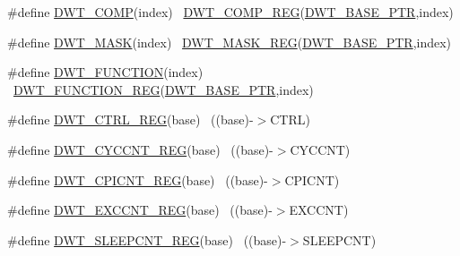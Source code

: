 \begin{DoxyCompactItemize}
\item 
\#define \hyperlink{group___d_w_t___register___accessor___macros_ga8cd13337dbf7cec23c7f8c3621860e9e}{D\+W\+T\+\_\+\+C\+O\+MP}(index)                                                ~\hyperlink{group___d_w_t___register___accessor___macros_gad03eebac5bf5c3c3e461e156ba6e37ae}{D\+W\+T\+\_\+\+C\+O\+M\+P\+\_\+\+R\+EG}(\hyperlink{group___d_w_t___peripheral_ga3b46dfb2ea7946c6938028d879c82cb1}{D\+W\+T\+\_\+\+B\+A\+S\+E\+\_\+\+P\+TR},index)
\item 
\#define \hyperlink{group___d_w_t___register___accessor___macros_ga293560983db73f0a6acead2a597fe349}{D\+W\+T\+\_\+\+M\+A\+SK}(index)                                                ~\hyperlink{group___d_w_t___register___accessor___macros_ga16461875f56f3b91ee27a53a9f4dbc78}{D\+W\+T\+\_\+\+M\+A\+S\+K\+\_\+\+R\+EG}(\hyperlink{group___d_w_t___peripheral_ga3b46dfb2ea7946c6938028d879c82cb1}{D\+W\+T\+\_\+\+B\+A\+S\+E\+\_\+\+P\+TR},index)
\item 
\#define \hyperlink{group___d_w_t___register___accessor___macros_ga6fc901c7f1391678b4058358fd39b877}{D\+W\+T\+\_\+\+F\+U\+N\+C\+T\+I\+ON}(index)                                        ~\hyperlink{group___d_w_t___register___accessor___macros_gaedc0f311fdf85789a988b58375481265}{D\+W\+T\+\_\+\+F\+U\+N\+C\+T\+I\+O\+N\+\_\+\+R\+EG}(\hyperlink{group___d_w_t___peripheral_ga3b46dfb2ea7946c6938028d879c82cb1}{D\+W\+T\+\_\+\+B\+A\+S\+E\+\_\+\+P\+TR},index)
\item 
\#define \hyperlink{group___d_w_t___register___accessor___macros_ga805e8330d1aa986d534abe1eed2614df}{D\+W\+T\+\_\+\+C\+T\+R\+L\+\_\+\+R\+EG}(base)                                          ~((base)-\/$>$C\+T\+RL)
\item 
\#define \hyperlink{group___d_w_t___register___accessor___macros_ga745c3ae737eb0e94dde4b3e1178920af}{D\+W\+T\+\_\+\+C\+Y\+C\+C\+N\+T\+\_\+\+R\+EG}(base)                                      ~((base)-\/$>$C\+Y\+C\+C\+NT)
\item 
\#define \hyperlink{group___d_w_t___register___accessor___macros_ga57a7caeb5e0d4038c88b5adb8a31ac4e}{D\+W\+T\+\_\+\+C\+P\+I\+C\+N\+T\+\_\+\+R\+EG}(base)                                      ~((base)-\/$>$C\+P\+I\+C\+NT)
\item 
\#define \hyperlink{group___d_w_t___register___accessor___macros_gacfd254c94211e8165496d8c22a02b996}{D\+W\+T\+\_\+\+E\+X\+C\+C\+N\+T\+\_\+\+R\+EG}(base)                                      ~((base)-\/$>$E\+X\+C\+C\+NT)
\item 
\#define \hyperlink{group___d_w_t___register___accessor___macros_gad4f054164e8c0594edcc3672d3122903}{D\+W\+T\+\_\+\+S\+L\+E\+E\+P\+C\+N\+T\+\_\+\+R\+EG}(base)                                  ~((base)-\/$>$S\+L\+E\+E\+P\+C\+NT)

\end{DoxyCompactItemize}
